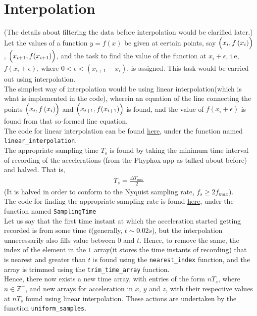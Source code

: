 \documentclass[oneside]{book}
\begin{document}
\chapter{Interpolation}
(The details about filtering the data before interpolation would be clarified later.)\\
Let the values of a function $y = f(x)$ be given at certain points, say $\Bigl(x_i,f\left(x_i\right)\Bigr)$, $\Bigl(x_{i+1}, f(x_{i+1})\Bigr)$, and the task to find the value of the function at $x_i + \epsilon$, i.e,\\ $f(x_i + \epsilon)$, where $0<\epsilon < (x_{i+1} - x_i)$, is assigned. This task would be carried out using interpolation. \\
\bigskip
The simplest way of interpolation would be using linear interpolation(which is what is implemented in the code), wherein an equation of the line connecting the points $\Bigl(x_i,f\left(x_i\right)\Bigr)$ and $\Bigl(x_{i+1}, f(x_{i+1})\Bigr)$ is found, and the value of $f(x_i + \epsilon)$ is found from that so-formed line equation.\\
\bigskip
The code for linear interpolation can be found \href{https://github.com/HarryNyquist/Odometry/blob/main/Codes/2_DataFunctions.cpp}{here}, under the function named \verb|linear_interpolation|.\\
\bigskip
The appropriate sampling time $T_s$ is found by taking the minimum time interval of recording of the accelerations (from the Phyphox app as talked about before) and halved. That is,
\begin{align}
    T_s = \frac{\Delta T_{min}}{2}
\end{align}
(It is halved in order to conform to the Nyquist sampling rate, $f_s \geq 2f_{max}$). \\
The code for finding the appropriate sampling rate is found \href{https://github.com/HarryNyquist/Odometry/blob/main/Codes/2_DataFunctions.cpp}{here}, under the function named \verb|SamplingTime| \\
\bigskip
Let us say that the first time instant at which the acceleration started getting recorded is from some time $t$(generally, $t \sim 0.02s$), but the interpolation unnecessarily also fills value between 0 and $t$. Hence, to remove the same, the index of the element in the \verb|t| array(it stores the time instants of recording) that is nearest and greater than $t$ is found using the \verb|nearest_index| function, and the array is trimmed using the \verb|trim_time_array| function. \\
\bigskip
Hence, there now exists a new time array, with entries of the form $nT_s$, where $n \in \mathbb{Z}^+$, and new arrays for acceleration in $x$, $y$ and $z$, with their respective values at $nT_s$ found using linear interpolation. These actions are undertaken by the function \verb|uniform_samples|. \\
\end{document}
